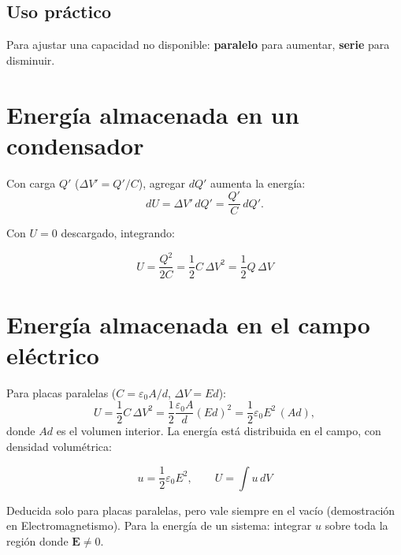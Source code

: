 \documentclass[12pt,a4paper]{article}
\begin{document}
\subsection{Uso práctico}

Para ajustar una capacidad no disponible: \textbf{paralelo} para
aumentar, \textbf{serie} para disminuir.

\section{Energía almacenada en un condensador}

Con carga $Q'$ ($\Delta V' = Q'/C$), agregar $dQ'$ aumenta la energía:
\[
dU = \Delta V'\, dQ' = \frac{Q'}{C}\,dQ'.
\]

Con $U=0$ descargado, integrando:

\begin{keybox}
  \[
  \boxed{U = \frac{Q^2}{2C} = \frac{1}{2}C\,\Delta V^2 = \frac{1}{2}Q\,\Delta V}
  \]
\end{keybox}

\section{Energía almacenada en el campo eléctrico}

Para placas paralelas ($C = \varepsilon_0 A/d$, $\Delta V = E d$):
\[
U = \frac{1}{2}C\,\Delta V^2
  = \frac{1}{2}\frac{\varepsilon_0 A}{d}(E d)^2
  = \frac{1}{2}\varepsilon_0 E^2\,(A d),
\]
donde $A d$ es el volumen interior. La energía está distribuida en el
campo, con densidad volumétrica:

\begin{keybox}
  \[
  \boxed{u = \frac{1}{2}\varepsilon_0 E^2}, \qquad U = \int u\, dV
  \]
\end{keybox}

\begin{notebox}[Validez]
  Deducida solo para placas paralelas, pero vale siempre en el vacío
  (demostración en Electromagnetismo). Para la energía de un sistema:
  integrar $u$ sobre toda la región donde $\mathbf{E}\neq 0$.
\end{notebox}
\end{document}
